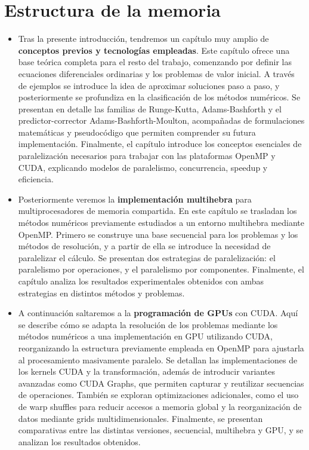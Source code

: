 \section{Estructura de la memoria}
\begin{itemize}
	\item Tras la presente introducción, tendremos un capítulo muy amplio de \textbf{conceptos previos y tecnologías empleadas}. Este capítulo ofrece una base teórica completa para el resto del trabajo, comenzando por definir las ecuaciones diferenciales ordinarias y los problemas de valor inicial. A través de ejemplos se introduce la idea de aproximar soluciones paso a paso, y posteriormente se profundiza en la clasificación de los métodos numéricos. Se presentan en detalle las familias de Runge-Kutta, Adams-Bashforth y el predictor-corrector Adams-Bashforth-Moulton, acompañadas de formulaciones matemáticas y pseudocódigo que permiten comprender su futura implementación. Finalmente, el capítulo introduce los conceptos esenciales de paralelización necesarios para trabajar con las plataformas OpenMP y CUDA, explicando modelos de paralelismo, concurrencia, speedup y eficiencia.
	
	\item Posteriormente veremos la \textbf{implementación multihebra} para multiprocesadores de memoria compartida. En este capítulo se trasladan los métodos numéricos previamente estudiados a un entorno multihebra mediante OpenMP. Primero se construye una base secuencial para los problemas y los métodos de resolución, y a partir de ella se introduce la necesidad de paralelizar el cálculo. Se presentan dos estrategias de paralelización: el paralelismo por operaciones, y el paralelismo por componentes. Finalmente, el capítulo analiza los resultados experimentales obtenidos con ambas estrategias en distintos métodos y problemas.
	
	\item A continuación saltaremos a la \textbf{programación de GPUs} con CUDA. Aquí se describe cómo se adapta la resolución de los problemas mediante los métodos numéricos a una implementación en GPU utilizando CUDA, reorganizando la estructura previamente empleada en OpenMP para ajustarla al procesamiento masivamente paralelo. Se detallan las implementaciones de los kernels CUDA y la transformación, además de introducir variantes avanzadas como CUDA Graphs, que permiten capturar y reutilizar secuencias de operaciones. También se exploran optimizaciones adicionales, como el uso de warp shuffles para reducir accesos a memoria global y la reorganización de datos mediante grids multidimensionales. Finalmente, se presentan comparativas entre las distintas versiones, secuencial, multihebra y GPU, y se analizan los resultados obtenidos.
	

\end{itemize}

